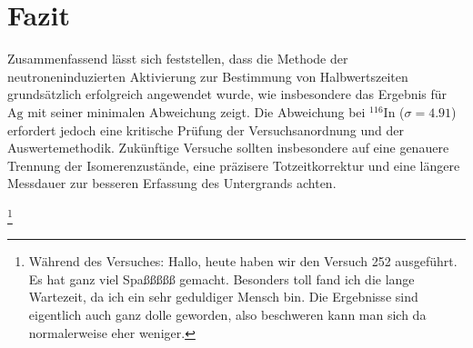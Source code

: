 \section{Fazit}
Zusammenfassend lässt sich feststellen, dass die Methode der neutroneninduzierten Aktivierung zur Bestimmung von Halbwertszeiten grundsätzlich erfolgreich angewendet wurde, wie insbesondere das Ergebnis für $\text{Ag}$ mit seiner minimalen Abweichung zeigt.  Die Abweichung bei $^{116}\text{In}$ ($\sigma = 4.91$) erfordert jedoch eine kritische Prüfung der Versuchsanordnung und der Auswertemethodik. Zukünftige Versuche sollten insbesondere auf eine genauere Trennung der Isomerenzustände, eine präzisere Totzeitkorrektur und eine längere Messdauer zur besseren Erfassung des Untergrands achten.

\footnote{Während des Versuches: Hallo, heute haben wir den Versuch 252 ausgeführt. Es hat ganz viel Spaßßßßß gemacht. Besonders toll fand ich die lange Wartezeit, da ich ein sehr geduldiger Mensch bin. Die Ergebnisse sind eigentlich auch ganz dolle geworden, also beschweren kann man sich da normalerweise eher weniger.}